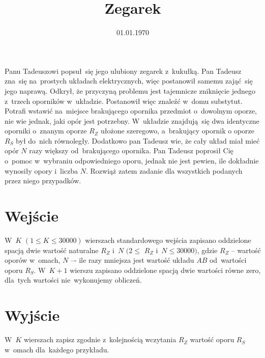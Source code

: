 \documentclass[zad]{soigstyl}
\date{01.01.1970}
\title{\mbox{Zegarek}}
\begin{document}
\begin{tasktext}%
    \noindent
    Panu Tadeuszowi popsuł~się jego ulubiony zegarek z~kukułką. Pan Tadeusz zna~się na~prostych układach elektrycznych, więc postanowił samemu zająć~się jego naprawą. Odkrył, że przyczyną problemu jest tajemnicze zniknięcie jednego z~trzech oporników w~układzie. Postanowił więc znaleźć w~domu substytut. Potrafi wstawić na~miejsce brakującego opornika przedmiot o~dowolnym oporze, nie wie jednak, jaki opór jest potrzebny. W~układzie znajdują~się dwa identyczne oporniki o~znanym oporze $R_Z$ ułożone szeregowo, a~brakujący opornik o oporze $R_S$ był do~nich równoległy. Dodatkowo pan Tadeusz wie, że cały układ miał mieć opór $N$ razy większy od~brakującego opornika. Pan Tadeusz poprosił Cię o~pomoc w~wybraniu odpowiedniego oporu, jednak nie jest pewien, ile dokładnie wynosiły opory i~liczba $N$. Rozwiąż zatem zadanie dla wszystkich podanych przez niego przypadków.
	
    	\section{Wejście}
	W~$K$ $(1 \leqslant K \leqslant 30000)$ wierszach standardowego wejścia zapisano oddzielone spacją dwie wartość naturalne $R_Z$ i~$N$ $(2 \leqslant$ $R_Z$ i~$N \leqslant 30000)$, gdzie $R_Z$ -- wartość oporów w~omach, $N$ –- ile razy mniejsza jest wartość układu $AB$ od~wartości oporu $R_S$. W~$K+1$ wierszu zapisano oddzielone spacją dwie wartości równe zero, dla~tych wartości nie~wykonujemy obliczeń. 

	\section{Wyjście}
	W~$K$ wierszach zapisz zgodnie z~kolejnością wczytania $R_Z$ wartość oporu $R_S$ w~omach dla~każdego przykładu.
	
	\oigprzyklady
\end{tasktext}
\end{document}
